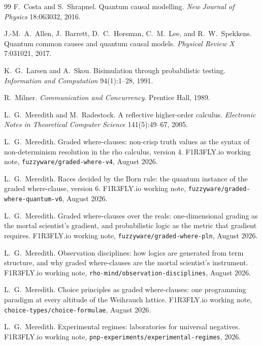 \documentclass[11pt,a4paper]{article}
\theoremstyle{plain}
\theoremstyle{definition}
\theoremstyle{remark}
\begin{document}
\begin{thebibliography}{99}
F.~Costa and S.~Shrapnel.
\newblock Quantum causal modelling.
\newblock \emph{New Journal of Physics} 18:063032, 2016.

J.-M.~A.~Allen, J.~Barrett, D.~C.~Horsman, C.~M.~Lee, and R.~W.~Spekkens.
\newblock Quantum common causes and quantum causal models.
\newblock \emph{Physical Review X} 7:031021, 2017.

K.~G.~Larsen and A.~Skou.
\newblock Bisimulation through probabilistic testing.
\newblock \emph{Information and Computation} 94(1):1--28, 1991.

R.~Milner.
\newblock \emph{Communication and Concurrency}.
\newblock Prentice Hall, 1989.

L.~G.~Meredith and M.~Radestock.
\newblock A reflective higher-order calculus.
\newblock \emph{Electronic Notes in Theoretical Computer Science}
141(5):49--67, 2005.

L.~G.~Meredith.
\newblock Graded where-clauses: non-crisp truth values as the syntax of
non-determinism resolution in the rho calculus, version 4.
\newblock F1R3FLY.io working note, \texttt{fuzzyware/graded-where-v4}, August
2026.

L.~G.~Meredith.
\newblock Races decided by the Born rule: the quantum instance of the graded
where-clause, version 6.
\newblock F1R3FLY.io working note, \texttt{fuzzyware/graded-where-quantum-v6},
August 2026.

L.~G.~Meredith.
\newblock Graded where-clauses over the reals: one-dimensional grading as the
mortal scientist's gradient, and probabilistic logic as the metric that
gradient requires.
\newblock F1R3FLY.io working note, \texttt{fuzzyware/graded-where-pln}, August
2026.

L.~G.~Meredith.
\newblock Observation disciplines: how logics are generated from term
structure, and why graded where-clauses are the mortal scientist's instrument.
\newblock F1R3FLY.io working note, \texttt{rho-mind/observation-disciplines},
August 2026.

L.~G.~Meredith.
\newblock Choice principles as graded where-clauses: one programming paradigm
at every altitude of the Weihrauch lattice.
\newblock F1R3FLY.io working note, \texttt{choice-types/choice-formulae},
August 2026.

L.~G.~Meredith.
\newblock Experimental regimes: laboratories for universal negatives.
\newblock F1R3FLY.io working note, \texttt{pnp-experiments/experimental-regimes},
2026.


\end{thebibliography}
\end{document}
